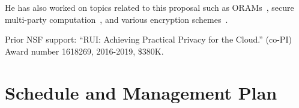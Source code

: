 \documentclass[11pt]{article}
\theoremstyle{remark}
\begin{document}
He has also worked on topics related to this proposal such as
ORAMs~\cite{SP:RocAviCho16,NDSS:ACMR17,CCS:RACM17}, secure multi-party
computation~\cite{AC:CEJMY07,TCC:CDMW09,AC:CEMY09,RSA:CHKMR12,TCC:CKKZ12,PKC:CKWZ13,C:CKMZ14,TCC:CKSYZ14},
and various encryption schemes~\cite{TCC:CDMW08,AC:CDMW09,AC:LCLPY13}. 

Prior NSF support: ``RUI: Achieving Practical Privacy for the Cloud.'' (co-PI) Award number 1618269, 2016-2019, \$380K. 

\section{Schedule and Management Plan}



\end{document}
